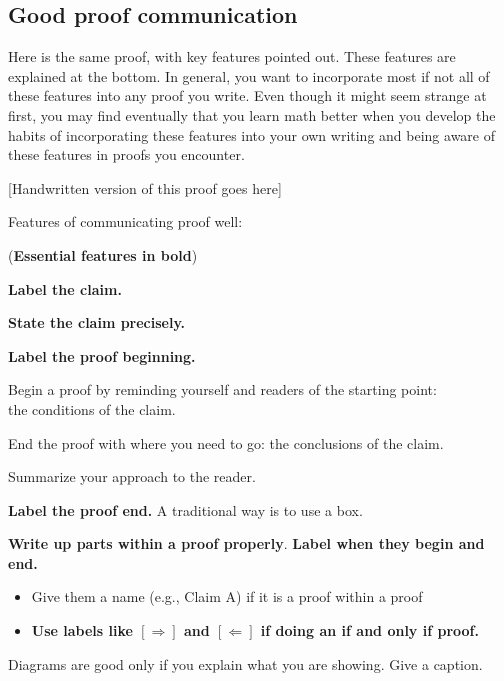 \documentclass[11pt]{article}
\theoremstyle{definition}
\begin{document}
\newpage
\subsection{Good proof communication}

Here is the same proof, with key features pointed out. These features are explained at the bottom. In general, you want to incorporate most if not all of these features into any proof you write. Even though it might seem strange at first, you may find eventually that you learn math better when you develop the habits of incorporating these features into your own writing and being aware of these features in proofs you encounter.

\begin{mdframed}{}
[Handwritten version of this proof goes here]
\end{mdframed}


\begin{minipage}{5.5in}
\begin{mdframed}\raggedright\parskip2pt
Features of communicating proof well:

({\bf Essential features in bold})

\begin{enumerate*}
\item {\bf Label the claim.}
\item {\bf State the claim precisely.}
\item {\bf Label the proof beginning.}
\item Begin a proof by reminding yourself and readers of the starting point:\\ the conditions of the claim.
\item End the proof with where you need to go: the conclusions of the claim.
\item Summarize your approach to the reader. 
\item {\bf Label the proof end.} A traditional way is to use a box.
\item {\bf Write up parts within a proof properly}. {\bf Label when they begin and end.}
	\begin{itemize} 
	\item Give them a name (e.g., Claim A) if it is a proof within a proof
	\item {\bf Use labels like $[\Rightarrow]$ and $[\Leftarrow]$ if doing an if and only if proof.}
	\end{itemize}

\item Diagrams are good only if you explain what you are showing. Give a caption.
\end{enumerate*}
\end{mdframed}
\end{minipage}
\end{document}
